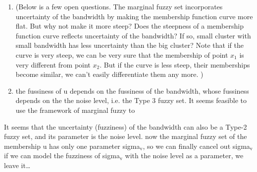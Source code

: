 \documentclass[journal]{IEEEtran}
\begin{document}
\begin{enumerate}
\item (Below is a few open questions. The marginal fuzzy set incorporates uncertainty of the bandwidth by making the membership function curve more flat.  But why not make it more steep? Does the steepness of a membership function curve reflects uncertainty of the bandwidth? If so, small cluster with small bandwidth has less uncertainty than the big cluster? Note that if the curve is very steep, we can be very sure that the membership of point $x_1$ is very different from point $x_2$. But if the curve is less steep, their memberships become similar, we can't easily differentiate them any more. )
\item the fussiness of u depends on the fussiness of the bandwidth, whose fussiness depends on the the noise level, i.e. the Type 3 fuzzy set. It seems feasible to use the framework of marginal fuzzy to
\end{enumerate}
It seems that the uncertainty (fuzziness) of the bandwidth can also be a Type-2 fuzzy set, and its parameter is the noise level.
 now the marginal fuzzy set of the membership u has only one parameter sigma$_{\text{v}}$, so we can finally cancel out sigma$_{\text{v}}$ if we can model the fuzziness of sigma$_{\text{v}}$ with the noise level as a parameter, we leave it\ldots{}




\end{document}
